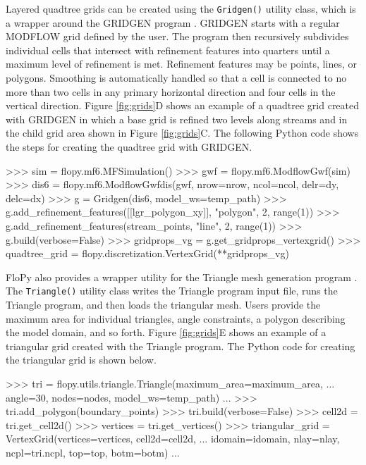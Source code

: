 \documentclass[12pt, oneside]{article}  	%
\begin{document}
Layered quadtree grids can be created using the \texttt{Gridgen()} utility class, which is a wrapper around the GRIDGEN program \citep{gridgen}. GRIDGEN starts with a regular MODFLOW grid defined by the user. The program then recursively subdivides individual cells that intersect with refinement features into quarters until a maximum level of refinement is met. Refinement features may be points, lines, or polygons. Smoothing is automatically handled so that a cell is connected to no more than two cells in any primary horizontal direction and four cells in the vertical direction. Figure \ref{fig:grids}D shows an example of a quadtree grid created with GRIDGEN in which a base grid is refined two levels along streams and in the child grid area shown in Figure \ref{fig:grids}C. The following Python code shows the steps for creating the quadtree grid with GRIDGEN.

\begin{python}
>>> sim = flopy.mf6.MFSimulation()
>>> gwf = flopy.mf6.ModflowGwf(sim)
>>> dis6 = flopy.mf6.ModflowGwfdis(gwf, nrow=nrow, ncol=ncol, delr=dy, delc=dx)
>>> g = Gridgen(dis6, model_ws=temp_path)
>>> g.add_refinement_features([[lgr_polygon_xy]], "polygon", 2, range(1))
>>> g.add_refinement_features(stream_points, "line", 2, range(1))
>>> g.build(verbose=False)
>>> gridprops_vg = g.get_gridprops_vertexgrid()
>>> quadtree_grid = flopy.discretization.VertexGrid(**gridprops_vg)
\end{python}

FloPy also provides a wrapper utility for the Triangle mesh generation program \citep{trianglemesh}. The \texttt{Triangle()} utility class writes the Triangle program input file, runs the Triangle program, and then loads the triangular mesh. Users provide the maximum area for individual triangles, angle constraints, a polygon describing the model domain, and so forth. Figure \ref{fig:grids}E shows an example of a triangular grid created with the Triangle program. The Python code for creating the triangular grid is shown below.

\begin{python}
>>> tri = flopy.utils.triangle.Triangle(maximum_area=maximum_area, 
... angle=30, nodes=nodes, model_ws=temp_path)
...
>>> tri.add_polygon(boundary_points)
>>> tri.build(verbose=False)
>>> cell2d = tri.get_cell2d()
>>> vertices = tri.get_vertices()
>>> triangular_grid = VertexGrid(vertices=vertices, cell2d=cell2d, 
... idomain=idomain, nlay=nlay, ncpl=tri.ncpl, top=top, botm=botm)
...
\end{python}
\end{document}
